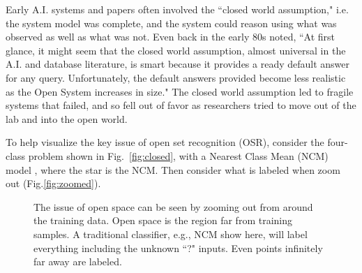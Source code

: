 \documentclass[letterpaper]{article}
\begin{document}
Early A.I. systems and papers often involved the ``closed world assumption," i.e.
the system model was complete, and the system could reason using what was observed as well as what was not.
Even back in the early 80s  \cite{hewitt83analyzing} noted, ``At first glance, it might seem that the closed world assumption, almost universal in the A.I.
and database literature, is smart because it provides a ready default answer for any query.
Unfortunately, the default answers provided become less realistic as the Open System increases in size."
The closed world assumption led to fragile systems that failed, and so fell out of favor as researchers tried to move out of the lab and into the open world.

To help visualize the key issue of open set recognition (OSR), consider the four-class problem shown in Fig.~\ref{fig:closed}, with a Nearest Class Mean (NCM) model  \cite{mensink2012metric}, where the star is the NCM. Then consider what is labeled when zoom out (Fig.\ref{fig:zoomed}).
\begin{figure}
\center
{}
        {
        }
       \caption{ The issue of open space can be seen by zooming out from around the training data. 
       Open space is the region far from training samples.  A traditional classifier, e.g., NCM show here,  will label everything including the unknown ``?" inputs. Even points infinitely far away are labeled.}
\end{figure}
\end{document}
